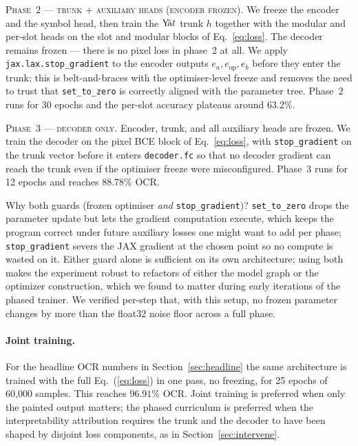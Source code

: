 \documentclass[11pt]{article}
\theoremstyle{papsty}
\newcommand{\yat}{$\textnormal{Y}\!\bar{\text{a}}t$}
\begin{document}
\textsc{Phase~2 — trunk + auxiliary heads (encoder frozen).}
We freeze the encoder and the symbol head, then train the \yat{} trunk
$h$ together with the modular and per-slot heads on the slot and
modular blocks of Eq.~\ref{eq:loss}. The decoder remains frozen — there
is no pixel loss in phase~2 at all. We apply
\texttt{jax.lax.stop\_gradient} to the encoder outputs
$e_a, e_{\mathrm{op}}, e_b$ before they enter the trunk; this is
belt-and-braces with the optimiser-level freeze and removes the need to
trust that \texttt{set\_to\_zero} is correctly aligned with the
parameter tree. Phase~2 runs for 30 epochs and the per-slot accuracy
plateaus around $63.2\%$.

\textsc{Phase~3 — decoder only.}
Encoder, trunk, and all auxiliary heads are frozen. We train the
decoder on the pixel BCE block of Eq.~\ref{eq:loss}, with
\texttt{stop\_gradient} on the trunk vector before it enters
\texttt{decoder.fc} so that no decoder gradient can reach the trunk
even if the optimiser freeze were misconfigured. Phase~3 runs for 12
epochs and reaches $88.78\%$ OCR.

Why both guards (frozen optimiser \emph{and} \texttt{stop\_gradient})?
\texttt{set\_to\_zero} drops the parameter update but lets the gradient
computation execute, which keeps the program correct under future
auxiliary losses one might want to add per phase;
\texttt{stop\_gradient} severs the JAX gradient at the chosen point so
no compute is wasted on it.
Either guard alone is sufficient on its own architecture; using both
makes the experiment robust to refactors of either the model graph or
the optimizer construction, which we found to matter during early
iterations of the phased trainer.
We verified per-step that, with this setup, no frozen parameter changes
by more than the float32 noise floor across a full phase.

\paragraph{Joint training.}
For the headline OCR numbers in Section~\ref{sec:headline} the same
architecture is trained with the full Eq.~(\ref{eq:loss}) in one pass,
no freezing, for 25 epochs of 60{,}000 samples. This reaches $96.91\%$
OCR. Joint training is preferred when only the painted output matters;
the phased curriculum is preferred when the interpretability
attribution requires the trunk and the decoder to have been shaped by
disjoint loss components, as in Section~\ref{sec:intervene}.
\end{document}
